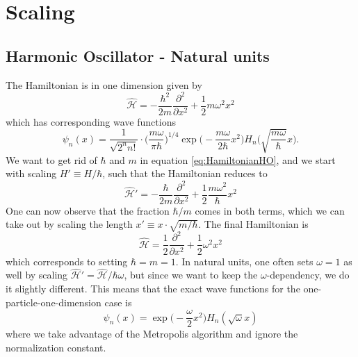 \chapter{Scaling}

\section{Harmonic Oscillator - Natural units}
The Hamiltonian is in one dimension given by
\begin{equation}
\hat{\mathcal{H}}=-\frac{\hbar^2}{2m}\frac{\partial^2}{\partial x^2}+\frac{1}{2}m\omega^2x^2
\label{eq:HamiltonianHO}
\end{equation}
which has corresponding wave functions
\begin{equation}
\psi_n(x)=\frac{1}{\sqrt{2^nn!}}\cdot\bigg(\frac{m\omega}{\pi\hbar}\bigg)^{1/4}\exp\Big(-\frac{m\omega}{2\hbar}x^2\Big)H_n\Big(\sqrt{\frac{m\omega}{\hbar}}x\Big).
\end{equation}
We want to get rid of $\hbar$ and $m$ in equation \eqref{eq:HamiltonianHO}, and we start with scaling $H'\equiv H/\hbar$, such that the Hamiltonian reduces to
\begin{equation}
\hat{\mathcal{H}}'=-\frac{\hbar}{2m}\frac{\partial^2}{\partial x^2}+\frac{1}{2}\frac{m\omega^2}{\hbar}x^2
\end{equation}
One can now observe that the fraction $\hbar/m$ comes in both terms, which we can take out by scaling the length $x'\equiv x\cdot\sqrt{m/\hbar}$. The final Hamiltonian is
\begin{equation}
\hat{\mathcal{H}}=\frac{1}{2}\frac{\partial^2}{\partial x^2}+\frac{1}{2}\omega^2x^2
\end{equation}
which corresponds to setting $\hbar=m=1$. In natural units, one often sets $\omega=1$ as well by scaling $\hat{\mathcal{H}}'=\hat{\mathcal{H}}/\hbar\omega$, but since we want to keep the $\omega$-dependency, we do it slightly different. This means that the exact wave functions for the one-particle-one-dimension case is
\begin{equation}
\psi_n(x)=\exp\Big(-\frac{\omega}{2}x^2\Big)H_n(\sqrt{\omega}x)
\end{equation}
where we take advantage of the Metropolis algorithm and ignore the normalization constant. 

\newpage
